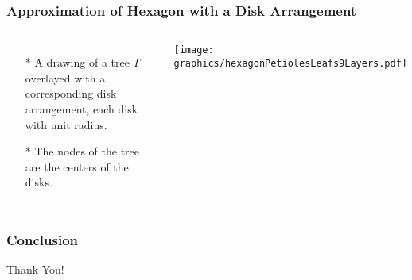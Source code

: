 \documentclass{beamer}
\begin{document}
\begin{frame} \frametitle{Approximation of Hexagon with a Disk Arrangement}
    \begin{columns}[c]
        \begin{itemize}
            \item[*] A drawing of a tree $T$ overlayed with a corresponding disk arrangement, each disk with unit radius.
            \item[*] The nodes of the tree are the centers of the disks.
        \end{itemize}
        \begin{minipage}{\linewidth}
            \begin{center}
            \texttt{[image: graphics/hexagonPetiolesLeafs9Layers.pdf]}\label{gfx:hexagonPetiolesLeafs9Layers.pdf}
            \end{center}
        \end{minipage}
    \end{columns}
\end{frame}
\begin{frame}\frametitle{Conclusion}

\end{frame}

\begin{frame}
\begin{center}
Thank You!
\end{center}
\end{frame}
\end{document}
